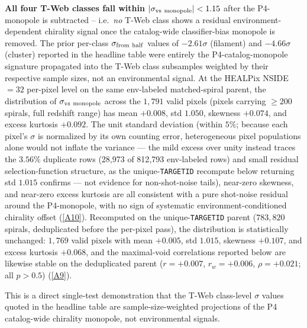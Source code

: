 \documentclass[aps,prd,twocolumn,superscriptaddress,showpacs,preprintnumbers,nofootinbib,longbibliography,floatfix]{revtex4-2}
\newcommand{\repoBase}{https://github.com/Hubify-Projects/bigbounce/blob/main}
\begin{document}
\textbf{All four T-Web classes fall within
$|\sigma_{\rm vs\ monopole}| < 1.15$} after the P4-monopole is
subtracted -- i.e.\ \emph{no} T-Web class shows a residual
environment-dependent chirality signal once the catalog-wide
classifier-bias monopole is removed. The prior per-class
$\sigma_{\rm from\ half}$ values of $-2.61\sigma$ (filament) and
$-4.66\sigma$ (cluster) reported in the headline table were entirely
the P4-catalog-monopole signature propagated into the T-Web class
subsamples weighted by their respective sample sizes, not an
environmental signal. At the HEALPix NSIDE $=32$ per-pixel level on
the same env-labeled matched-spiral parent, the distribution of
$\sigma_{\rm vs\ monopole}$ across the $1{,}791$ valid pixels
(pixels carrying $\ge 200$ spirals, full redshift range) has
mean $+0.008$, std $1.050$, skewness $+0.074$, and excess kurtosis
$+0.092$. The unit standard deviation (within $5\%$; because each
pixel's $\sigma$ is normalized by its own counting error,
heterogeneous pixel populations alone would not inflate the variance
--- the mild excess over unity instead traces the $3.56\%$ duplicate
rows (28{,}973 of 812{,}793 env-labeled rows) and small residual selection-function structure, as the
unique-\texttt{TARGETID} recompute below returning std $1.015$
confirms --- not evidence for non-shot-noise tails), near-zero
skewness, and near-zero excess kurtosis
are all consistent with a pure shot-noise residual
around the P4-monopole, with no sign of systematic
environment-conditioned chirality offset
(\href{\repoBase/pipelines/p5\_desi\_chirality/outputs/17\_v0151\_closure\_recomputes.json}{[A10]}).
Recomputed on the unique-\texttt{TARGETID} parent ($783{,}820$
spirals, deduplicated before the per-pixel pass), the distribution is
statistically unchanged: $1{,}769$ valid pixels with mean $+0.005$,
std $1.015$, skewness $+0.107$, and excess kurtosis $+0.068$, and the
maximal-void correlations reported below are likewise stable on the
deduplicated parent ($r = +0.007$, $r_w = +0.006$, $\rho = +0.021$;
all $p > 0.5$)
(\href{\repoBase/pipelines/p5\_desi\_chirality/outputs/22\_r24conf\_local\_batch.json}{[A9]}).

This is a direct single-test demonstration that
the T-Web class-level $\sigma$ values quoted in the headline table
are sample-size-weighted projections of the P4 catalog-wide chirality
monopole, not environmental signals.
\end{document}
